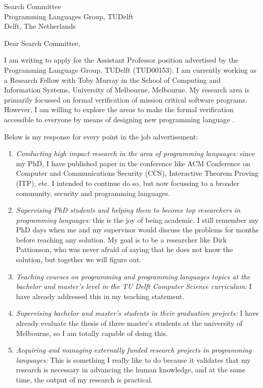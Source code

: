 \documentclass{letter}
\begin{document}
\begin{letter}{Search Committee\\
Programming Languages Group, TUDelft\\
Delft, The Netherlands}


\opening{Dear Search Committee,}


I am writing to apply for the Assistant Professor position advertised by the Programming Language Group, TUDelft (TUD00153). 
I am currently working as a Research Fellow with Toby Murray in the School of Computing and Information Systems, University 
of Melbourne, Melbourne. My research area is primarily focussed on formal verification of mission critical software programs.  
However, I am willing to explore the areas to make the formal verification accessible to everyone by means of designing new programming language . 
 
Below is my response for every point in the job advertisement: 
\begin{enumerate}
\item \textit{Conducting high impact research in the area of programming languages:}
	since my PhD, I have published paper in the conference like ACM Conference on Computer and Communications Security (CCS), 
	Interactive Theorem Proving (ITP),  etc. I intended to continue do so, but now focussing to a broader community, security and programming languages. 
	
\item \textit{Supervising PhD students and helping them to become top researchers in programming languages:} 
  this is the joy of being academic. I still remember my PhD days when me and my supervisor would 
  discuss the problems for months before reaching any solution. My goal is to be a researcher like Dirk Pattionson, who was never afraid of 
  saying that he does not know the solution, but together we will figure out.   
   
\item \textit{Teaching courses on programming and programming languages topics at the bachelor and master’s level in the TU Delft Computer Science curriculum:}
  I have already addressed this in my teaching statement.   	
  
\item \textit{Supervising bachelor and master’s students in their graduation projects:} 
  I have already evaluate the thesis of three master's students at the university of Melbourne, so I am totally capable of doing this. 
  
\item \textit{Acquiring and managing externally funded research projects in programming languages:}
  This is something I really like to do because it validates that my research is necessary in advancing the human knowledge, and at the 
  same time,  the output of my research is practical. 
 


\end{enumerate}
\end{letter}
\end{document}
